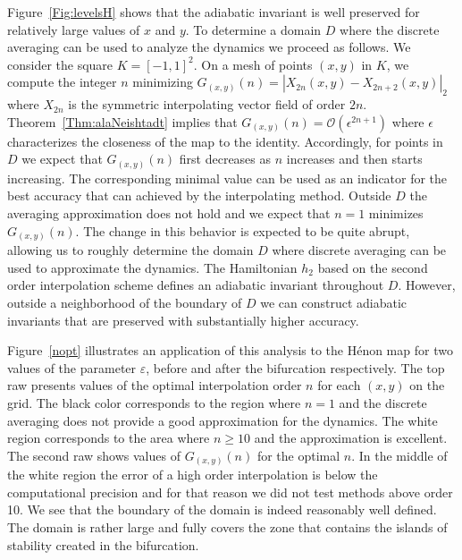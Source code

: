 \documentclass[a4paper,12pt]{article}
\begin{document}
Figure~\ref{Fig:levelsH}
shows that the adiabatic invariant is well preserved  for relatively large values of $x$ and $y$.
To determine  a domain $D$ where the discrete averaging can be used to analyze the dynamics we proceed as follows.
We consider the 
square $K=[-1,1]^2$. On a mesh of points $(x,y)$ in
$K$, we compute the integer $n$ minimizing $G_{(x,y)}(n)=|X_{2n}(x,y) -
X_{2n+2}(x,y)|_2$ where $X_{2n}$ is the symmetric
interpolating vector field of order $2n$.
Theorem~\ref{Thm:alaNeishtadt} implies that $G_{(x,y)}(n)=
\mathcal{O}(\epsilon^{2n+1})$  where $\epsilon$
characterizes  the closeness of the map to the identity.
Accordingly, for points in $D$  we expect that $G_{(x,y)}(n)$ first decreases as $n$ increases and then starts increasing.  The corresponding minimal value can be used as an indicator 
for the best accuracy that can achieved by the interpolating method. 
Outside $D$ the averaging 
approximation does not hold and we expect that $n=1$ minimizes $G_{(x,y)}(n)$.
The change in this behavior is expected to be quite abrupt, allowing us to
roughly determine the domain $D$ where discrete averaging can be used to approximate the dynamics. 
The Hamiltonian $h_2$ based on the second order interpolation scheme
defines an adiabatic invariant throughout $D$.
However, outside a neighborhood of the boundary of $ D$
 we can construct adiabatic invariants that are preserved with substantially higher accuracy.

Figure~\ref{nopt} illustrates an application of this analysis to the Hénon map
for two values of the parameter $\varepsilon$, before and after the bifurcation respectively. The top raw presents values of the optimal interpolation order $n$
for each  $(x,y)$ on the grid. The black color corresponds to the region
where $n=1$ and the discrete averaging does not provide a good approximation
for the dynamics. The white region corresponds to the area where $n\ge10$ and the
approximation is excellent. The 
second raw shows values of $G_{(x,y)}(n)$ for the optimal $n$. 
In the middle of the white region 
the error of a high order interpolation is below the computational precision
and for that reason we did not test methods above order 10.
We see that the boundary of the domain is indeed reasonably well defined.
The domain is rather large and fully covers the zone that contains the islands of
stability created in the bifurcation. 
\end{document}
